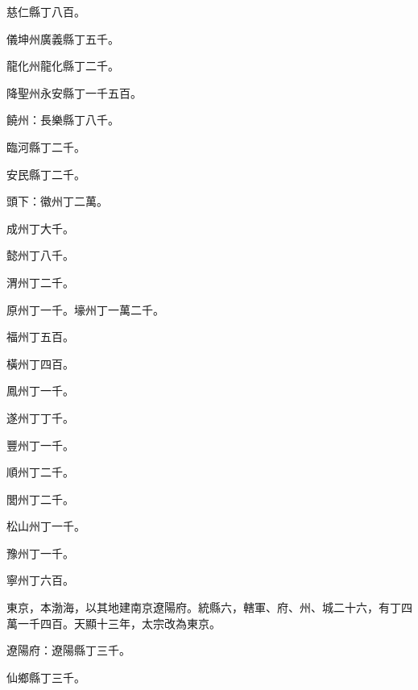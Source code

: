 \begin{pinyinscope}
 慈仁縣丁八百。



 儀坤州廣義縣丁五千。



 龍化州龍化縣丁二千。



 降聖州永安縣丁一千五百。



 饒州：長樂縣丁八千。



 臨河縣丁二千。



 安民縣丁二千。



 頭下：徽州丁二萬。



 成州丁大千。



 懿州丁八千。



 渭州丁二千。



 原州丁一千。壕州丁一萬二千。



 福州丁五百。



 橫州丁四百。



 鳳州丁一千。



 遂州丁丁千。



 豐州丁一千。



 順州丁二千。



 閭州丁二千。



 松山州丁一千。



 豫州丁一千。



 寧州丁六百。



 東京，本渤海，以其地建南京遼陽府。統縣六，轄軍、府、州、城二十六，有丁四萬一千四百。天顯十三年，太宗改為東京。



 遼陽府：遼陽縣丁三千。



 仙鄉縣丁三千。




\end{pinyinscope}
